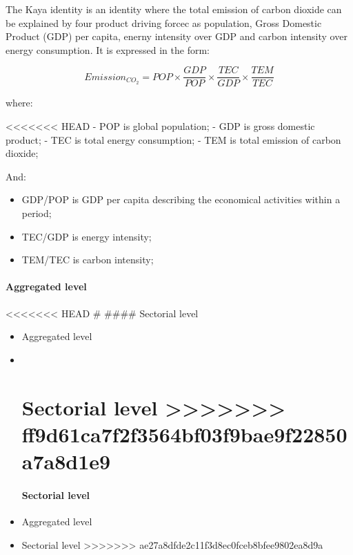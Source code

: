 \documentclass[
]{article}
\providecommand{\tightlist}{%
  \setlength{\itemsep}{0pt}\setlength{\parskip}{0pt}}
\begin{document}
The Kaya identity is an identity where the total emission of carbon
dioxide can be explained by four product driving forcec as population,
Gross Domestic Product (GDP) per capita, enerny intensity over GDP and
carbon intensity over energy consumption. It is expressed in the form:

\[ Emission_{CO_2} = POP \times\frac{GDP}{POP} \times \frac{TEC}{GDP} \times \frac{TEM}{TEC}\]

where:

\textless\textless\textless\textless\textless\textless\textless{} HEAD -
POP is global population; - GDP is gross domestic product; - TEC is
total energy consumption; - TEM is total emission of carbon dioxide;

And:

\begin{itemize}
\tightlist
\item
  GDP/POP is GDP per capita describing the economical activities within
  a period;
\item
  TEC/GDP is energy intensity;
\item
  TEM/TEC is carbon intensity;
\end{itemize}

\hypertarget{aggregated-level}{%
\paragraph{Aggregated level}\label{aggregated-level}}

\textless\textless\textless\textless\textless\textless\textless{} HEAD
\# \#\#\#\# Sectorial level

\begin{itemize}
\item
  Aggregated level
\item ~
  \hypertarget{sectorial-level-ff9d61ca7f2f3564bf03f9bae9f22850a7a8d1e9}{%
  \section{Sectorial level
  \textgreater\textgreater\textgreater\textgreater\textgreater\textgreater\textgreater{}
  ff9d61ca7f2f3564bf03f9bae9f22850a7a8d1e9}\label{sectorial-level-ff9d61ca7f2f3564bf03f9bae9f22850a7a8d1e9}}

  \hypertarget{sectorial-level}{%
  \paragraph{Sectorial level}\label{sectorial-level}}
\item
  Aggregated level
\item
  Sectorial level
  \textgreater\textgreater\textgreater\textgreater\textgreater\textgreater\textgreater{}
  ae27a8dfde2c11f3d8ec0fceb8bfee9802ea8d9a
\end{itemize}
\end{document}
